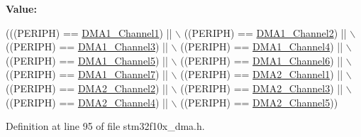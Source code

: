 {\bfseries Value\+:}
\begin{DoxyCode}
(((PERIPH) == \hyperlink{group___peripheral__declaration_gac83c5be824be1c02716e2522e80ddf7a}{DMA1\_Channel1}) || \(\backslash\)
                                   ((PERIPH) == \hyperlink{group___peripheral__declaration_ga23d7631dd10c645e06971b2543ba2949}{DMA1\_Channel2}) || \(\backslash\)
                                   ((PERIPH) == \hyperlink{group___peripheral__declaration_gacf7b6093a37b306d7f1f50b2f200f0d0}{DMA1\_Channel3}) || \(\backslash\)
                                   ((PERIPH) == \hyperlink{group___peripheral__declaration_gad2c42743316bf64da557130061b1f56a}{DMA1\_Channel4}) || \(\backslash\)
                                   ((PERIPH) == \hyperlink{group___peripheral__declaration_ga06ff98ddef3c962795d2e2444004abff}{DMA1\_Channel5}) || \(\backslash\)
                                   ((PERIPH) == \hyperlink{group___peripheral__declaration_gac013c4376e4797831b5ddd2a09519df8}{DMA1\_Channel6}) || \(\backslash\)
                                   ((PERIPH) == \hyperlink{group___peripheral__declaration_ga4f9c23b3d1add93ed206b5c9afa5cda3}{DMA1\_Channel7}) || \(\backslash\)
                                   ((PERIPH) == \hyperlink{group___peripheral__declaration_gad86c75e1ff89e03e15570f47962865c8}{DMA2\_Channel1}) || \(\backslash\)
                                   ((PERIPH) == \hyperlink{group___peripheral__declaration_ga316024020799373b9d8e35c316c74f24}{DMA2\_Channel2}) || \(\backslash\)
                                   ((PERIPH) == \hyperlink{group___peripheral__declaration_ga6dca52a79587e0ca9a5d669048b4c7eb}{DMA2\_Channel3}) || \(\backslash\)
                                   ((PERIPH) == \hyperlink{group___peripheral__declaration_ga612b396657695191ad740b0b59bc9f12}{DMA2\_Channel4}) || \(\backslash\)
                                   ((PERIPH) == \hyperlink{group___peripheral__declaration_ga521c13b7d0f82a6897d47995da392750}{DMA2\_Channel5}))
\end{DoxyCode}


Definition at line 95 of file stm32f10x\+\_\+dma.\+h.

